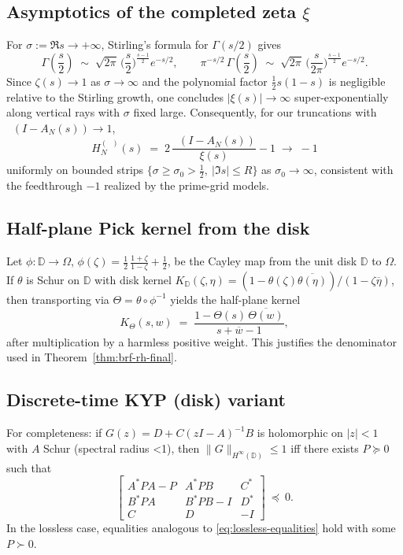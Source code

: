 \documentclass[11pt]{article}
\theoremstyle{definition}
\theoremstyle{remark}
\DeclareMathOperator{\dettwo}{det_2}
\begin{document}
\subsection{Asymptotics of the completed zeta \(\xi\)}\label{app:xi-asymptotics}
For \(\sigma:=\Re s\to+\infty\), Stirling's formula for \(\Gamma(s/2)\) gives
\[
 \Gamma\!\left(\frac{s}{2}\right)\;\sim\;\sqrt{2\pi}\,\Big(\frac{s}{2}\Big)^{\frac{s-1}{2}} e^{-s/2},\qquad \pi^{-s/2}\,\Gamma\!\left(\frac{s}{2}\right)\;\sim\;\sqrt{2\pi}\,\Big(\frac{s}{2\pi}\Big)^{\frac{s-1}{2}} e^{-s/2}.
\]
Since \(\zeta(s)\to 1\) as \(\sigma\to\infty\) and the polynomial factor \(\tfrac12 s(1-s)\) is negligible relative to the Stirling growth, one concludes \(|\xi(s)|\to\infty\) super-exponentially along vertical rays with \(\sigma\) fixed large. Consequently, for our truncations with \(\dettwo(I-A_N(s))\to 1\),
\[
 H_N^{(\dettwo)}(s)\;=\;2\,\frac{\dettwo(I-A_N(s))}{\xi(s)}-1\;\longrightarrow\;-1
\]
uniformly on bounded strips \(\{\sigma\ge \sigma_0>\tfrac12,\ |\Im s|\le R\}\) as \(\sigma_0\to\infty\), consistent with the feedthrough \(-1\) realized by the prime-grid models.

\subsection{Half-plane Pick kernel from the disk}
Let \(\phi:\mathbb D\to\Omega\), \(\phi(\zeta)=\tfrac12\,\frac{1+\zeta}{1-\zeta}+\tfrac12\), be the Cayley map from the unit disk \(\mathbb D\) to \(\Omega\). If \(\theta\) is Schur on \(\mathbb D\) with disk kernel \(K_{\mathbb D}(\zeta,\eta)=(1-\theta(\zeta)\overline{\theta(\eta)})/(1-\zeta\overline{\eta})\), then transporting via \(\Theta=\theta\circ\phi^{-1}\) yields the half-plane kernel
\[
 K_\Theta(s,w)\;=\;\frac{1-\Theta(s)\,\overline{\Theta(w)}}{s+\overline{w}-1},
\]
after multiplication by a harmless positive weight. This justifies the denominator used in Theorem~\ref{thm:brf-rh-final}.
\subsection{Discrete-time KYP (disk) variant}
For completeness: if \(G(z)=D+C(zI-A)^{-1}B\) is holomorphic on \(|z|<1\) with \(A\) Schur (spectral radius <1), then \(\|G\|_{H^\infty(\mathbb D)}\le 1\) iff there exists \(P\succeq 0\) such that
\[
 \begin{bmatrix}
  A^*PA-P & A^*PB & C^*\\
  B^*PA & B^*PB-I & D^*\\
  C & D & -I
 \end{bmatrix}\ \preceq\ 0.
\]
In the lossless case, equalities analogous to \eqref{eq:lossless-equalities} hold with some \(P\succ 0\).
\end{document}
